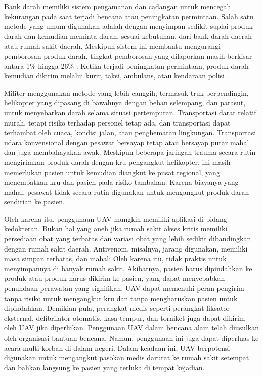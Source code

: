 Bank darah memiliki sistem pengamanan dan cadangan untuk mencegah kekurangan pada saat terjadi bencana atau peningkatan permintaan. Salah satu metode yang umum digunakan adalah dengan menyimpan sedikit suplai produk darah dan kemudian meminta darah, sesuai kebutuhan, dari bank darah daerah atau rumah sakit daerah. Meskipun sistem ini membantu mengurangi pemborosan produk darah, tingkat pemborosan yang dilaporkan masih berkisar antara 1\% hingga 26\% \citep{galloway2008tabletop}. Ketika terjadi peningkatan permintaan, produk darah kemudian dikirim melalui kurir, taksi, ambulans, atau kendaraan polisi \citep{sandler2002transportation}. 

Militer menggunakan metode yang lebih canggih, termasuk truk berpendingin, helikopter yang dipasang di bawahnya dengan beban selempang, dan parasut, untuk menyebarkan darah selama situasi pertempuran. Transportasi darat relatif murah, tetapi risiko terhadap personel tetap ada, dan transportasi dapat terhambat oleh cuaca, kondisi jalan, atau penghematan lingkungan. Transportasi udara konvensional dengan pesawat bersayap tetap atau bersayap putar mahal dan juga membahayakan awak. Meskipun beberapa jaringan trauma secara rutin mengirimkan produk darah dengan kru pengangkut helikopter, ini masih memerlukan pasien untuk kemudian diangkut ke pusat regional, yang menempatkan kru dan pasien pada risiko tambahan. Karena biayanya yang mahal, pesawat tidak secara rutin digunakan untuk mengangkut produk darah sendirian ke pasien.

Oleh karena itu, penggunaan UAV mungkin memiliki aplikasi di bidang kedokteran. Bukan hal yang aneh jika rumah sakit akses kritis memiliki persediaan obat yang terbatas dan variasi obat yang lebih sedikit dibandingkan dengan rumah sakit daerah. Antivenom, misalnya, jarang digunakan, memiliki masa simpan terbatas, dan mahal; Oleh karena itu, tidak praktis untuk menyimpannya di banyak rumah sakit. Akibatnya, pasien harus dipindahkan ke produk atau produk harus dikirim ke pasien, yang dapat menyebabkan penundaan perawatan yang signifikan. UAV dapat memenuhi peran pengirim tanpa risiko untuk mengangkut kru dan tanpa mengharuskan pasien untuk dipindahkan. Demikian pula, perangkat medis seperti perangkat fiksator eksternal, defibrilator otomatis, kasa tempur, dan torniket juga dapat dikirim oleh UAV jika diperlukan. Penggunaan UAV dalam bencana alam telah diusulkan oleh organisasi bantuan bencana. Namun, penggunaan ini juga dapat diperluas ke acara multi-korban di dalam negeri. Dalam keadaan ini, UAV berpotensi digunakan untuk mengangkut pasokan medis darurat ke rumah sakit setempat dan bahkan langsung ke pasien yang terluka di tempat kejadian.